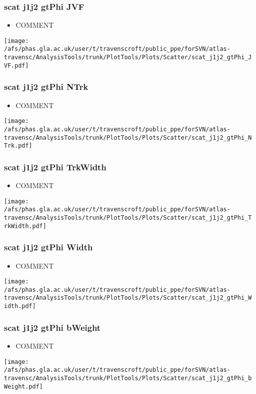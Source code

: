 \documentclass{beamer}
\begin{document}
\begin{frame}
\frametitle{scat j1j2 gtPhi JVF}
\begin{itemize}
\item COMMENT
\end{itemize}
\begin{center}
\texttt{[image: /afs/phas.gla.ac.uk/user/t/travenscroft/public\_ppe/forSVN/atlas-travensc/AnalysisTools/trunk/PlotTools/Plots/Scatter/scat\_j1j2\_gtPhi\_JVF.pdf]}
\end{center}
\end{frame}

\begin{frame}
\frametitle{scat j1j2 gtPhi NTrk}
\begin{itemize}
\item COMMENT
\end{itemize}
\begin{center}
\texttt{[image: /afs/phas.gla.ac.uk/user/t/travenscroft/public\_ppe/forSVN/atlas-travensc/AnalysisTools/trunk/PlotTools/Plots/Scatter/scat\_j1j2\_gtPhi\_NTrk.pdf]}
\end{center}
\end{frame}

\begin{frame}
\frametitle{scat j1j2 gtPhi TrkWidth}
\begin{itemize}
\item COMMENT
\end{itemize}
\begin{center}
\texttt{[image: /afs/phas.gla.ac.uk/user/t/travenscroft/public\_ppe/forSVN/atlas-travensc/AnalysisTools/trunk/PlotTools/Plots/Scatter/scat\_j1j2\_gtPhi\_TrkWidth.pdf]}
\end{center}
\end{frame}

\begin{frame}
\frametitle{scat j1j2 gtPhi Width}
\begin{itemize}
\item COMMENT
\end{itemize}
\begin{center}
\texttt{[image: /afs/phas.gla.ac.uk/user/t/travenscroft/public\_ppe/forSVN/atlas-travensc/AnalysisTools/trunk/PlotTools/Plots/Scatter/scat\_j1j2\_gtPhi\_Width.pdf]}
\end{center}
\end{frame}

\begin{frame}
\frametitle{scat j1j2 gtPhi bWeight}
\begin{itemize}
\item COMMENT
\end{itemize}
\begin{center}
\texttt{[image: /afs/phas.gla.ac.uk/user/t/travenscroft/public\_ppe/forSVN/atlas-travensc/AnalysisTools/trunk/PlotTools/Plots/Scatter/scat\_j1j2\_gtPhi\_bWeight.pdf]}
\end{center}
\end{frame}
\end{document}
